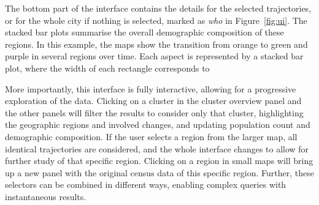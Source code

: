 The bottom part of the interface contains the details for the selected
trajectories, or for the whole city if nothing is selected, marked as \emph{who}
in Figure~\ref{fig:ui}. The stacked bar plots summarise the overall demographic
composition of these regions. In this example, the maps show the transition from
orange to green and purple in several regions over time. Each aspect is
represented by a stacked bar plot, where the width of each rectangle corresponds
to 

More importantly, this interface is fully interactive, allowing for a
progressive exploration of the data. Clicking on a cluster in the cluster
overview panel and the other panels will filter the results to consider only
that cluster, highlighting the geographic regions and involved changes, and
updating population count and demographic composition. If the user selects a
region from the larger map, all identical trajectories are considered, and the
whole interface changes to allow for further study of that specific region.
Clicking on a region in small maps will bring up a new panel with the original
census data of this specific region. Further, these selectors can be combined in
different ways, enabling complex queries with instantaneous results.